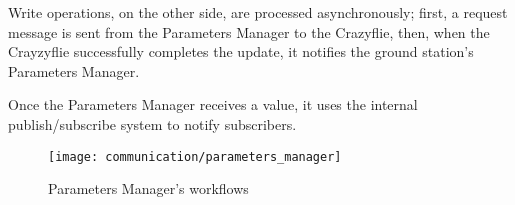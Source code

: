 Write operations, on the other side, are processed asynchronously; first, a request message is sent from the Parameters Manager to the Crazyflie,
then, when the Crayzyflie successfully completes the update, it notifies the ground station's Parameters Manager.

Once the Parameters Manager receives a value, it uses the internal publish/subscribe system to notify subscribers.  

\begin{figure}[h]
    \centering
    \texttt{[image: communication/parameters\_manager]}
    \caption{Parameters Manager's workflows}\label{fig:parameters_manager}
\end{figure}

